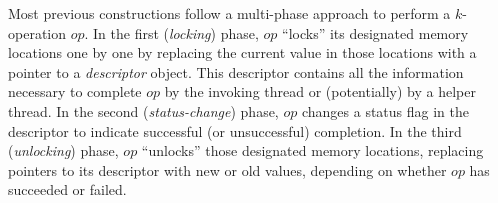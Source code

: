 

 




Most previous \mcas{} constructions follow a multi-phase approach to perform a $k$-\cas{} operation $op$.
In the first (\textit{locking}) phase, $op$ ``locks'' its designated memory locations one by one by replacing the current value in those locations with a pointer to a \textit{descriptor} object. This descriptor contains all the information necessary to complete $op$ by the invoking thread or (potentially) by a helper thread.  In the second (\textit{status-change}) phase, $op$ changes a status flag in the descriptor to indicate successful (or unsuccessful) completion.
In the third (\textit{unlocking}) phase, $op$ ``unlocks'' those 
designated memory locations, replacing pointers to its descriptor with new or old values, depending on whether $op$ has succeeded or failed.

